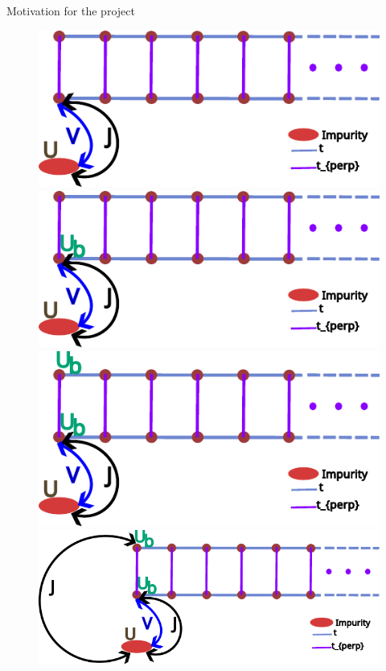\documentclass{beamer}
\begin{document}
\begin{frame}{Motivation for the project}
\begin{figure}[!ht]
    \centering
    \includegraphics[scale=0.6]{3-orbital-model-1.pdf}
    \includegraphics[scale=0.6]{3-orbital-model-2.pdf}
    \includegraphics[scale=0.6]{3-orbital-model-3.pdf}
    \includegraphics[scale=0.6]{3-orbital-model-4.pdf}
\end{figure}
\end{frame}
\end{document}
